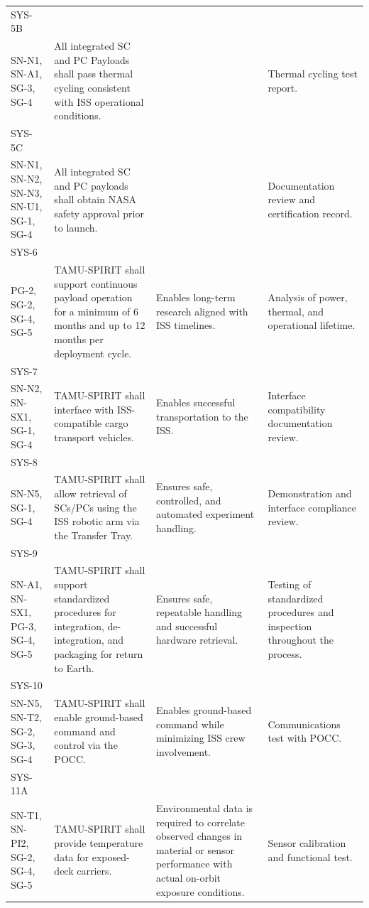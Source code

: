 \documentclass[conf]{new-aiaa}
\begin{document}
{\begin{longtable}{@{}p{2.2cm}p{4.1cm}p{4.1cm}p{4.1cm}@{}}
SYS-5B\\SN-N1, SN-A1, SG-3, SG-4 &
All integrated SC and PC Payloads shall pass thermal cycling consistent with ISS operational conditions. &
 &
Thermal cycling test report. \\ \hline

SYS-5C\\SN-N1, SN-N2, SN-N3, SN-U1, SG-1, SG-4 &
All integrated SC and PC payloads shall obtain NASA safety approval prior to launch. &
 &
Documentation review and certification record. \\ \hline

SYS-6\\PG-2, SG-2, SG-4, SG-5 &
TAMU-SPIRIT shall support continuous payload operation for a minimum of 6 months and up to 12 months per deployment cycle. &
Enables long-term research aligned with ISS timelines. &
Analysis of power, thermal, and operational lifetime. \\ \hline

SYS-7\\SN-N2, SN-SX1, SG-1, SG-4 &
TAMU-SPIRIT shall interface with ISS-compatible cargo transport vehicles. &
Enables successful transportation to the ISS. &
Interface compatibility documentation review. \\ \hline

SYS-8\\SN-N5, SG-1, SG-4 &
TAMU-SPIRIT shall allow retrieval of SCs/PCs using the ISS robotic arm via the Transfer Tray. &
Ensures safe, controlled, and automated experiment handling. &
Demonstration and interface compliance review. \\ \hline

SYS-9\\SN-A1, SN-SX1, PG-3, SG-4, SG-5 &
TAMU-SPIRIT shall support standardized procedures for integration, de-integration, and packaging for return to Earth. &
Ensures safe, repeatable handling and successful hardware retrieval. &
Testing of standardized procedures and inspection throughout the process. \\ \hline

SYS-10\\SN-N5, SN-T2, SG-2, SG-3, SG-4 &
TAMU-SPIRIT shall enable ground-based command and control via the POCC. &
Enables ground-based command while minimizing ISS crew involvement. &
Communications test with POCC. \\ \hline

SYS-11A\\SN-T1, SN-PI2, SG-2, SG-4, SG-5 &
TAMU-SPIRIT shall provide temperature data for exposed-deck carriers. &
Environmental data is required to correlate observed changes in material or sensor performance with actual on-orbit exposure conditions. &
Sensor calibration and functional test. \\ \hline


\end{longtable}}
\end{document}
